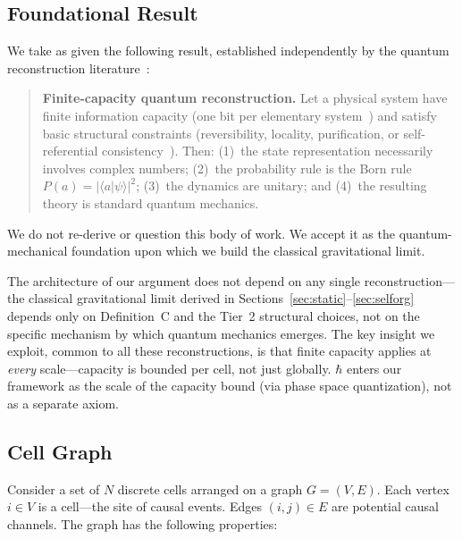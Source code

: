 \documentclass[aps,prd,twocolumn,showpacs,superscriptaddress,preprintnumbers]{revtex4-2}
\begin{document}
\subsection{Foundational Result}
\label{sec:foundational}

We take as given the following result, established independently by the quantum reconstruction literature~\cite{Zeilinger1999,Dakic2011,Chiribella2011,Masanes2011,Shaghaghi2023,Zilly:2026}:

\begin{quote}
\textbf{Finite-capacity quantum reconstruction.} Let a physical system have finite information capacity (one bit per elementary system~\cite{Zeilinger1999,Dakic2011}) and satisfy basic structural constraints (reversibility, locality, purification, or self-referential consistency~\cite{Chiribella2011,Masanes2011,Shaghaghi2023,Zilly:2026}). Then: (1)~the state representation necessarily involves complex numbers; (2)~the probability rule is the Born rule $P(a)=|\langle a|\psi\rangle|^2$; (3)~the dynamics are unitary; and (4)~the resulting theory is standard quantum mechanics.
\end{quote}

We do not re-derive or question this body of work. We accept it as the quantum-mechanical foundation upon which we build the classical gravitational limit.

The architecture of our argument does not depend on any single reconstruction---the classical gravitational limit derived in Sections~\ref{sec:static}--\ref{sec:selforg} depends only on Definition~C and the Tier~2 structural choices, not on the specific mechanism by which quantum mechanics emerges. The key insight we exploit, common to all these reconstructions, is that finite capacity applies at \emph{every} scale---capacity is bounded per cell, not just globally. $\hbar$ enters our framework as the scale of the capacity bound (via phase space quantization), not as a separate axiom.

\subsection{Cell Graph}

Consider a set of $N$ discrete cells arranged on a graph $G=(V,E)$.
Each vertex $i\in V$ is a cell---the site of causal events.
Edges $(i,j)\in E$ are potential causal channels.
The graph has the following properties:
\end{document}
